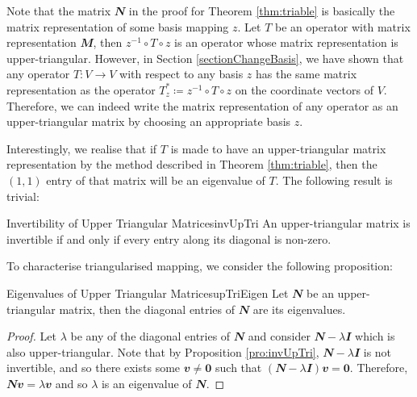 \documentclass[math, code]{amznotes}
\theoremstyle{remark}
\newcommand{\zero}{\mathbf{0}}
\begin{document}
Note that the matrix $\mathbfit{N}$ in the proof for Theorem \ref{thm:triable} is basically the matrix representation of some basis mapping $z$. Let $T$ be an operator with matrix representation $\mathbfit{M}$, then $z^{-1} \circ T \circ z$ is an operator whose matrix representation is upper-triangular. However, in Section \ref{sectionChangeBasis}, we have shown that any operator $T \colon V \to V$ with respect to any basis $z$ has the same matrix representation as the operator $T^*_z \coloneqq z^{-1} \circ T \circ z$ on the coordinate vectors of $V$. Therefore, we can indeed write the matrix representation of any operator as an upper-triangular matrix by choosing an appropriate basis $z$.

Interestingly, we realise that if $T$ is made to have an upper-triangular matrix representation by the method described in Theorem \ref{thm:triable}, then the $(1, 1)$ entry of that matrix will be an eigenvalue of $T$. The following result is trivial:
\begin{probox}{Invertibility of Upper Triangular Matrices}{invUpTri}
    An upper-triangular matrix is invertible if and only if every entry along its diagonal is non-zero.
\end{probox}
To characterise triangularised mapping, we consider the following proposition:
\begin{probox}{Eigenvalues of Upper Triangular Matrices}{upTriEigen}
    Let $\mathbfit{N}$ be an upper-triangular matrix, then the diagonal entries of $\mathbfit{N}$ are its eigenvalues.
    \tcblower
    \begin{proof}
        Let $\lambda$ be any of the diagonal entries of $\mathbfit{N}$ and consider $\mathbfit{N} - \lambda\mathbfit{I}$ which is also upper-triangular. Note that by Proposition \ref{pro:invUpTri}, $\mathbfit{N} - \lambda\mathbfit{I}$ is not invertible, and so there exists some $\mathbfit{v} \neq \zero$ such that $(\mathbfit{N} - \lambda\mathbfit{I})\mathbfit{v} = \zero$. Therefore, $\mathbfit{Nv} = \lambda\mathbfit{v}$ and so $\lambda$ is an eigenvalue of $\mathbfit{N}$.
    \end{proof}
\end{probox}
\end{document}
